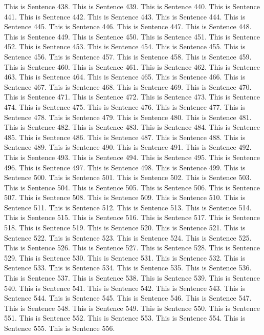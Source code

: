 \documentclass{article}
\begin{document}
This is Sentence 438.
This is Sentence 439.
This is Sentence 440.
This is Sentence 441.
This is Sentence 442.
This is Sentence 443.
This is Sentence 444.
This is Sentence 445.
This is Sentence 446.
This is Sentence 447.
This is Sentence 448.
This is Sentence 449.
This is Sentence 450.
This is Sentence 451.
This is Sentence 452.
This is Sentence 453.
This is Sentence 454.
This is Sentence 455.
This is Sentence 456.
This is Sentence 457.
This is Sentence 458.
This is Sentence 459.
This is Sentence 460.
This is Sentence 461.
This is Sentence 462.
This is Sentence 463.
This is Sentence 464.
This is Sentence 465.
This is Sentence 466.
This is Sentence 467.
This is Sentence 468.
This is Sentence 469.
This is Sentence 470.
This is Sentence 471.
This is Sentence 472.
This is Sentence 473.
This is Sentence 474.
This is Sentence 475.
This is Sentence 476.
This is Sentence 477.
This is Sentence 478.
This is Sentence 479.
This is Sentence 480.
This is Sentence 481.
This is Sentence 482.
This is Sentence 483.
This is Sentence 484.
This is Sentence 485.
This is Sentence 486.
This is Sentence 487.
This is Sentence 488.
This is Sentence 489.
This is Sentence 490.
This is Sentence 491.
This is Sentence 492.
This is Sentence 493.
This is Sentence 494.
This is Sentence 495.
This is Sentence 496.
This is Sentence 497.
This is Sentence 498.
This is Sentence 499.
This is Sentence 500.
This is Sentence 501.
This is Sentence 502.
This is Sentence 503.
This is Sentence 504.
This is Sentence 505.
This is Sentence 506.
This is Sentence 507.
This is Sentence 508.
This is Sentence 509.
This is Sentence 510.
This is Sentence 511.
This is Sentence 512.
This is Sentence 513.
This is Sentence 514.
This is Sentence 515.
This is Sentence 516.
This is Sentence 517.
This is Sentence 518.
This is Sentence 519.
This is Sentence 520.
This is Sentence 521.
This is Sentence 522.
This is Sentence 523.
This is Sentence 524.
This is Sentence 525.
This is Sentence 526.
This is Sentence 527.
This is Sentence 528.
This is Sentence 529.
This is Sentence 530.
This is Sentence 531.
This is Sentence 532.
This is Sentence 533.
This is Sentence 534.
This is Sentence 535.
This is Sentence 536.
This is Sentence 537.
This is Sentence 538.
This is Sentence 539.
This is Sentence 540.
This is Sentence 541.
This is Sentence 542.
This is Sentence 543.
This is Sentence 544.
This is Sentence 545.
This is Sentence 546.
This is Sentence 547.
This is Sentence 548.
This is Sentence 549.
This is Sentence 550.
This is Sentence 551.
This is Sentence 552.
This is Sentence 553.
This is Sentence 554.
This is Sentence 555.
This is Sentence 556.
\end{document}
